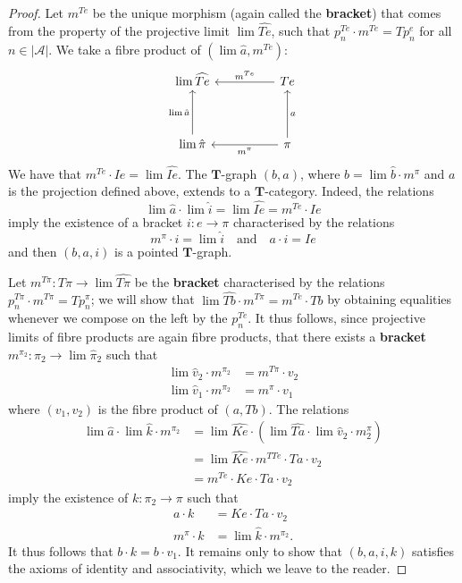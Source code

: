 \documentclass{article}
\newcommand{\oldpage}[1]{\marginpar{\footnotesize$\Big\vert$ \textit{p.~#1}}}
\newcommand{\unsure}[1]{{\color{purple}\textbf{#1}}}
\newcommand{\TT}{\mathbf{T}}
\newcommand{\textand}{\quad\text{and}\quad}
\newcommand{\cat}[1]{\mathcal{#1}}
\newcommand{\set}[1]{|#1|}
\begin{document}
\begin{proof}
  \oldpage{233}
  Let $m^{Te}$ be the unique morphism (again called the \unsure{bracket}) that comes from the property of the projective limit $\lim\widehat{Te}$, such that $p_n^{Te}\cdot m^{Te}=Tp_n^e$ for all $n\in\set{\cat{A}}$.
  We take a fibre product of $(\lim\hat{a},m^{Te})$:
  \[
    \begin{tikzcd}[sep=huge]
      \lim\widehat{Te}
    & Te
        \ar[l,swap,"m^{Te}"]
    \\\lim\hat{\pi}
        \ar[u,"\lim\hat{a}"]
    & \pi
        \ar[l,"m^\pi"]
        \ar[u,swap,"a"]
    \end{tikzcd}
  \]
  We have that $m^{Te}\cdot Ie=\lim\widehat{Ie}$.
  The $\TT$-graph $(b,a)$, where $b=\lim\hat{b}\cdot m^\pi$ and $a$ is the projection defined above, extends to a $\TT$-category.
  Indeed, the relations
  \[
    \lim\hat{a}\cdot\lim\hat{i}
    = \lim\widehat{Ie}
    = m^{Te}\cdot Ie
  \]
  imply the existence of a bracket $i\colon e\to\pi$ characterised by the relations
  \[
    m^\pi\cdot i
    = \lim\hat{i}
    \textand
    a\cdot i
    = Ie
  \]
  and then $(b,a,i)$ is a pointed $\TT$-graph.

  Let $m^{T\pi}\colon T\pi\to\lim\widehat{T\pi}$ be the \unsure{bracket} characterised by the relations $p_n^{T\pi}\cdot m^{T\pi}=Tp_n^\pi$;
  we will show that $\lim\widehat{Tb}\cdot m^{T\pi}=m^{Te}\cdot Tb$ by obtaining equalities whenever we compose on the left by the $p_n^{Te}$.
  It thus follows, since projective limits of fibre products are again fibre products, that there exists a \unsure{bracket} $m^{\pi_2}\colon\pi_2\to\lim\hat{\pi}_2$ such that
  \[
    \begin{aligned}
      \lim\hat{v}_2\cdot m^{\pi_2}
      &= m^{T\pi}\cdot v_2
    \\\lim\hat{v}_1\cdot m^{\pi_2}
      &= m^\pi\cdot v_1
    \end{aligned}
  \]
  where $(v_1,v_2)$ is the fibre product of $(a,Tb)$.
  The relations
  \[
    \begin{aligned}
      \lim\hat{a}\cdot\lim\hat{k}\cdot m^{\pi_2}
      &= \lim\widehat{Ke}\cdot(\lim\widehat{Ta}\cdot\lim\hat{v}_2\cdot m^\pi_2)
    \\&= \lim\widehat{Ke}\cdot m^{TTe}\cdot Ta\cdot v_2
    \\&= m^{Te}\cdot Ke\cdot Ta\cdot v_2
    \end{aligned}
  \]
  imply the existence of $k\colon\pi_2\to\pi$ such that
  \[
    \begin{aligned}
      a\cdot k
      &= Ke\cdot Ta\cdot v_2
    \\m^\pi\cdot k
      &= \lim\hat{k}\cdot m^{\pi_2}.
    \end{aligned}
  \]
  It thus follows that $b\cdot k=b\cdot v_1$.
  It remains only to show that $(b,a,i,k)$ satisfies the axioms of identity and associativity, which we leave to the reader.


\end{proof}
\end{document}
